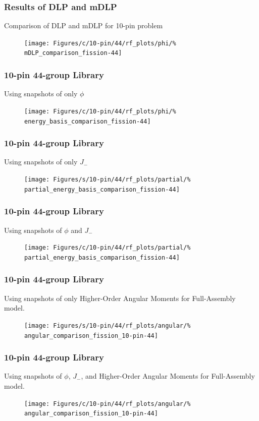 \documentclass[fleqn]{beamer}
\begin{document}
  \begin{frame}
      \frametitle{Results of DLP and mDLP}
      \centering
      Comparison of DLP and mDLP for 10-pin problem
      \begin{figure}
          \texttt{[image: Figures/c/10-pin/44/rf\_plots/phi/\%
              mDLP\_comparison\_fission-44]}
      \end{figure}
  \end{frame}
  
  \begin{frame}
    \frametitle{10-pin 44-group Library}
    \centering
    Using snapshots of only $\phi$
    \begin{figure}
    \texttt{[image: Figures/c/10-pin/44/rf\_plots/phi/\%
        energy\_basis\_comparison\_fission-44]}
    \end{figure}
  \end{frame}
  
  \begin{frame}
    \frametitle{10-pin 44-group Library}
    \centering
    Using snapshots of only $J_-$
    \begin{figure}
    \texttt{[image: Figures/s/10-pin/44/rf\_plots/partial/\%
        partial\_energy\_basis\_comparison\_fission-44]}
    \end{figure}
  \end{frame}
  
  \begin{frame}
    \frametitle{10-pin 44-group Library}
    \centering
    Using snapshots of $\phi$ and $J_-$
    \begin{figure}
    \texttt{[image: Figures/c/10-pin/44/rf\_plots/partial/\%
        partial\_energy\_basis\_comparison\_fission-44]}
    \end{figure}
  \end{frame}
  
  \begin{frame}
    \frametitle{10-pin 44-group Library}
    \centering
    Using snapshots of only Higher-Order Angular Moments for Full-Assembly 
model.
    \begin{figure}
    \texttt{[image: Figures/s/10-pin/44/rf\_plots/angular/\%
        angular\_comparison\_fission\_10-pin-44]}
    \end{figure}
  \end{frame}
  
  \begin{frame}
    \frametitle{10-pin 44-group Library}
    \centering
    Using snapshots of $\phi$, $J_-$, and Higher-Order Angular Moments  for 
Full-Assembly 
model.
    \begin{figure}
    \texttt{[image: Figures/c/10-pin/44/rf\_plots/angular/\%
        angular\_comparison\_fission\_10-pin-44]}
    \end{figure}
  \end{frame}
  
\end{document}
